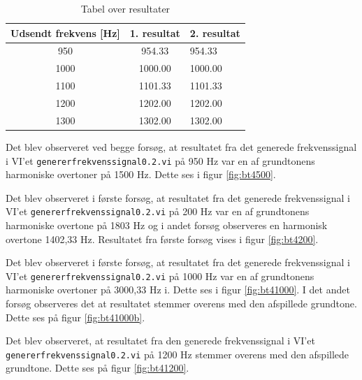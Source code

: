 			\begin{table}[]
				\centering
				\caption{Tabel over resultater}
				\label{bordtest5resultater}
				\begin{tabular}{lll}
					\multicolumn{1}{l|}{\textbf{Udsendt frekvens {[}Hz{]}}} & 	
					\multicolumn{1}{l|}{\textbf{1. resultat}} & \textbf{2. resultat} \\ \hline
					\multicolumn{1}{c|}{950}& 
					\multicolumn{1}{c|}{954.33}&954.33\\
					\multicolumn{1}{c|}{1000}& 
					\multicolumn{1}{c|}{1000.00}&1000.00\\
					\multicolumn{1}{c|}{1100}& 
					\multicolumn{1}{c|}{1101.33}&1101.33\\
					\multicolumn{1}{c|}{1200}& 
					\multicolumn{1}{c|}{1202.00}&1202.00\\
					\multicolumn{1}{c|}{1300}& 
					\multicolumn{1}{c|}{1302.00}&1302.00\\
                   
				\end{tabular}
			\end{table}

			Det blev observeret ved begge forsøg, at resultatet fra det generede frekvenssignal i VI'et \texttt{genererfrekvenssignal0.2.vi} på 950 Hz var  en af grundtonens harmoniske overtoner på 1500 Hz. Dette ses i figur \ref{fig:bt4500}. 

			 Det blev observeret i første forsøg, at resultatet fra det generede frekvenssignal i VI'et \texttt{genererfrekvenssignal0.2.vi} på 200 Hz var en af grundtonens harmoniske overtone på 1803 Hz og i andet forsøg observeres en harmonisk overtone 1402,33 Hz. Resultatet fra første forsøg vises i figur \ref{fig:bt4200}.
			 
			 Det blev observeret i første forsøg, at resultatet fra det generede frekvenssignal i VI'et \texttt{genererfrekvenssignal0.2.vi} på 1000 Hz var en af grundtonens harmoniske overtoner på 3000,33 Hz i. Dette ses i figur \ref{fig:bt41000}. I det andet forsøg observeres det at resultatet stemmer overens med den afspillede grundtone. Dette ses på figur \ref{fig:bt41000b}.  
			 
			 Det blev observeret, at resultatet fra den generede frekvenssignal i VI'et \texttt{genererfrekvenssignal0.2.vi} på 1200 Hz stemmer overens med den afspillede grundtone. Dette ses på figur \ref{fig:bt41200}.  
			 
